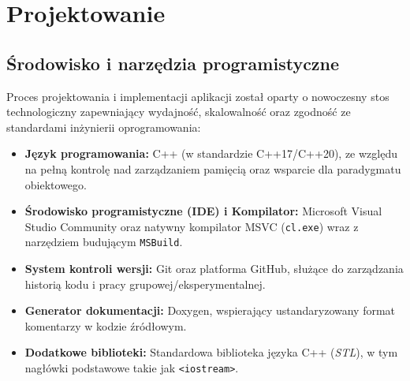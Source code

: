 \newpage
\section{Projektowanie}		%

\subsection{Środowisko i narzędzia programistyczne}
Proces projektowania i implementacji aplikacji został oparty o nowoczesny stos technologiczny zapewniający wydajność, skalowalność oraz zgodność ze standardami inżynierii oprogramowania:
\begin{itemize}
    \item \textbf{Język programowania:} C++ (w standardzie C++17/C++20), ze względu na pełną kontrolę nad zarządzaniem pamięcią oraz wsparcie dla paradygmatu obiektowego.
    \item \textbf{Środowisko programistyczne (IDE) i Kompilator:} Microsoft Visual Studio Community oraz natywny kompilator MSVC (\texttt{cl.exe}) wraz z narzędziem budującym \texttt{MSBuild}.
    \item \textbf{System kontroli wersji:} Git oraz platforma GitHub, służące do zarządzania historią kodu i pracy grupowej/eksperymentalnej.
    \item \textbf{Generator dokumentacji:} Doxygen, wspierający ustandaryzowany format komentarzy w kodzie źródłowym.
    \item \textbf{Dodatkowe biblioteki:} Standardowa biblioteka języka C++ (\textit{STL}), w tym nagłówki podstawowe takie jak \texttt{<iostream>}.
\end{itemize}

